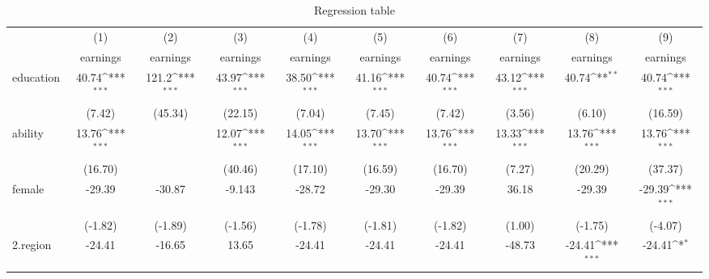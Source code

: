\begin{table}[htbp]\centering
\def\sym#1{\ifmmode^{#1}\else\(^{#1}\)\fi}
\caption{Regression table\label{tab1}}
\begin{tabular}{l*{9}{c}}
\hline\hline
            &\multicolumn{1}{c}{(1)}&\multicolumn{1}{c}{(2)}&\multicolumn{1}{c}{(3)}&\multicolumn{1}{c}{(4)}&\multicolumn{1}{c}{(5)}&\multicolumn{1}{c}{(6)}&\multicolumn{1}{c}{(7)}&\multicolumn{1}{c}{(8)}&\multicolumn{1}{c}{(9)}\\
            &\multicolumn{1}{c}{earnings}&\multicolumn{1}{c}{earnings}&\multicolumn{1}{c}{earnings}&\multicolumn{1}{c}{earnings}&\multicolumn{1}{c}{earnings}&\multicolumn{1}{c}{earnings}&\multicolumn{1}{c}{earnings}&\multicolumn{1}{c}{earnings}&\multicolumn{1}{c}{earnings}\\
\hline
education   &       40.74\sym{***}&       121.2\sym{***}&       43.97\sym{***}&       38.50\sym{***}&       41.16\sym{***}&       40.74\sym{***}&       43.12\sym{***}&       40.74\sym{**} &       40.74\sym{***}\\
            &      (7.42)         &     (45.34)         &     (22.15)         &      (7.04)         &      (7.45)         &      (7.42)         &      (3.56)         &      (6.10)         &     (16.59)         \\
[1em]
ability     &       13.76\sym{***}&                     &       12.07\sym{***}&       14.05\sym{***}&       13.70\sym{***}&       13.76\sym{***}&       13.33\sym{***}&       13.76\sym{***}&       13.76\sym{***}\\
            &     (16.70)         &                     &     (40.46)         &     (17.10)         &     (16.59)         &     (16.70)         &      (7.27)         &     (20.29)         &     (37.37)         \\
[1em]
female      &      -29.39         &      -30.87         &      -9.143         &      -28.72         &      -29.30         &      -29.39         &       36.18         &      -29.39         &      -29.39\sym{***}\\
            &     (-1.82)         &     (-1.89)         &     (-1.56)         &     (-1.78)         &     (-1.81)         &     (-1.82)         &      (1.00)         &     (-1.75)         &     (-4.07)         \\
[1em]
2.region    &      -24.41         &      -16.65         &       13.65         &      -24.41         &      -24.41         &      -24.41         &      -48.73         &      -24.41\sym{***}&      -24.41\sym{*}  \\

\end{tabular}
\end{table}
